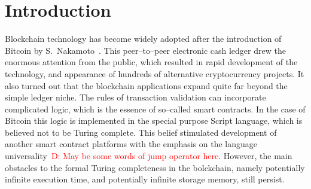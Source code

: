 \documentclass[runningheads]{llncs}
\newcommand{\dnote}[1]{\textcolor{red}{D: {#1}}}
\begin{document}
    \section{Introduction}
    Blockchain technology has become widely adopted after the introduction of
    Bitcoin by S.~Nakamoto~\cite{nakamoto2008bitcoin}. This peer--to--peer
    electronic cash ledger drew the enormous attention from the public, which
    resulted in rapid development of the technology, and appearance of hundreds
    of alternative cryptocurrency projects. It also turned out that the
    blockchain applications expand quite far beyond the simple ledger niche. The
    rules of transaction validation can incorporate complicated logic, which is
    the essence of so--called smart contracts. In the case of Bitcoin this logic
    is implemented in the special purpose Script language, which is believed not
    to be Turing complete. This belief stimulated development of another smart
    contract platforms with the emphasis on the language
    universality~\cite{buterin2014next}\dnote{May be some words of jump operator here}.
    However, the main obstacles to the
    formal Turing completeness in the bolckchain, namely potentially infinite
    execution time, and potentially infinite storage memory, still persist.
\end{document}
